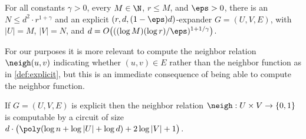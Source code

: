 \begin{theorem}\label{thm:expander}
  For all constants $\gamma > 0$,
  every $M \in \N$, $r \le M$,
  and $\eps > 0$,
  there is an
  $N \le d^2 \cdot r^{1 + \gamma}$ and an
  explicit
  $(r, d, (1- \eps)d)$-expander
  $G=(U, V, E)$,
  with $|U| = M$,
  $|V| = N$, and
  $d = O\big( ((\log M)(\log r) / \eps )^{1+1/\gamma}\big)$.
\end{theorem}


For our purposes it is more relevant to compute the neighbor relation
$\neigh(u,v)$ indicating whether $(u, v) \in E$ rather than the
neighbor function as in \cref{def:explicit}, but this is an immediate
consequence of being able to compute the neighbor function.

\begin{claim}
  \label{claim:explicit neigh}
  If $G = (U, V, E)$ is explicit then the neighbor relation
  $\neigh: U \times V \rightarrow \{0,1\}$ is computable by a circuit
  of size
  $d \cdot \big( \poly(\log n + \log |U| + \log d) + 2 \log |V| + 1
  \big)$.
\end{claim}





